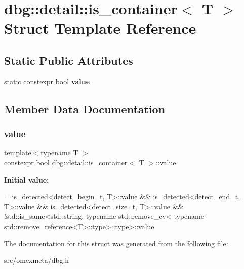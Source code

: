 \hypertarget{structdbg_1_1detail_1_1is__container}{}\section{dbg\+:\+:detail\+:\+:is\+\_\+container$<$ T $>$ Struct Template Reference}
\label{structdbg_1_1detail_1_1is__container}
\subsection*{Static Public Attributes}
\begin{DoxyCompactItemize}
\item 
static constexpr bool {\bfseries value}
\end{DoxyCompactItemize}


\subsection{Member Data Documentation}
\mbox{\label{structdbg_1_1detail_1_1is__container_aa9a4594488352384b65b36198ac414f8}} 
\subsubsection{\texorpdfstring{value}{value}}
{\footnotesize\ttfamily template$<$typename T $>$ \\
constexpr bool \hyperlink{structdbg_1_1detail_1_1is__container}{dbg\+::detail\+::is\+\_\+container}$<$ T $>$\+::value\hspace{0.3cm}{\ttfamily [static]}}

{\bfseries Initial value\+:}
\begin{DoxyCode}
=
      is\_detected<detect\_begin\_t, T>::value &&
      is\_detected<detect\_end\_t, T>::value &&
      is\_detected<detect\_size\_t, T>::value &&
      !std::is\_same<std::string,
                    \textcolor{keyword}{typename} std::remove\_cv<
                        \textcolor{keyword}{typename} std::remove\_reference<T>::type>::type>::value
\end{DoxyCode}


The documentation for this struct was generated from the following file\+:\begin{DoxyCompactItemize}
\item 
src/omexmeta/dbg.\+h\end{DoxyCompactItemize}
